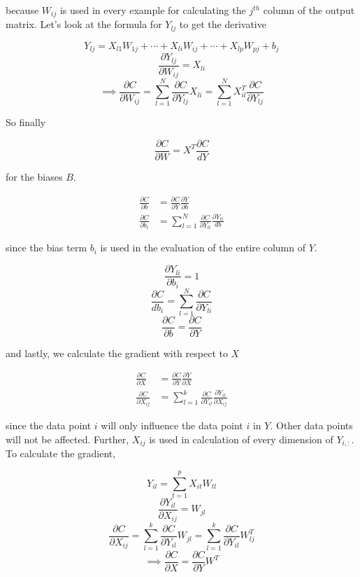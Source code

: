 \documentclass[a4paper, twocolumn, twoside]{article}
\begin{document}
	because $W_{ij}$ is used in every example for calculating the $j^{th}$ column of the output matrix. Let's look at the formula for $Y_{lj}$ to get the derivative

	$$
		Y_{lj} = X_{l1}W_{1j} + \cdots + X_{li}W_{ij} + \cdots + X_{lp}W_{pj} + b_{j}
	$$
	$$
		\frac{\partial Y_{lj}}{\partial W_{ij}} = X_{li}
	$$
	$$
		\implies \frac{\partial C}{\partial W_{ij}} = \sum_{l=1}^{N} \frac{\partial C}{\partial Y_{lj}} X_{li} = \sum_{l=1}^{N} X^{T}_{il}\frac{\partial C}{\partial Y_{lj}}
	$$

	So finally 

	$$
		\frac{\partial C}{\partial W} = X^{T} \frac{\partial C}{dY}
	$$

	for the biases $B$.

	\begin{align}
		\frac{\partial C}{\partial b} &= \frac{\partial C}{\partial Y} \frac{\partial Y}{\partial b}\\
		\frac{\partial C}{\partial b_{i}} &= \sum_{l=1}^{N} \frac{\partial C}{\partial Y_{li}} \frac{\partial Y_{li}}{db}
	\end{align}

	since the bias term $b_{i}$ is used in the evaluation of the entire column of $Y$.

	$$
		\frac{\partial Y_{li}}{\partial b_{i}} = 1
	$$
	$$
		\frac{\partial C}{db_{i}} = \sum_{l=1}^{N} \frac{\partial C}{\partial Y_{li}}
	$$
	$$
		\frac{\partial C}{\partial b} = \frac{\partial C}{\partial Y}
	$$

	and lastly, we calculate the gradient with respect to $X$

	\begin{align}
		\frac{\partial C}{\partial X} &= \frac{\partial C}{\partial Y} \frac{\partial Y}{\partial X}\\
		\frac{\partial C}{\partial X_{ij}} &= \sum_{l=1}^{k} \frac{\partial C}{\partial Y_{il}} \frac{\partial Y_{il}}{\partial X_{ij}}
	\end{align}

	since the data point $i$ will only influence the data point $i$ in $Y$. Other data points will not be affected. Further, $X_{ij}$ is used in calculation of every dimension of $Y_{i,:}$. To calculate the gradient,

	$$
		Y_{il} = \sum_{t=1}^{p} X_{it}W_{tl}
	$$
	$$
		\frac{\partial Y_{il}}{\partial X_{ij}} = W_{jl}
	$$
	$$
		\frac{\partial C}{\partial X_{ij}} = \sum_{l=1}^{k} \frac{\partial C}{\partial Y_{il}}W_{jl}
		= \sum_{l=1}^{k} \frac{\partial C}{\partial Y_{il}} W_{lj}^{T}
	$$
	$$
		\implies \frac{\partial C}{\partial X} = \frac{\partial C}{\partial Y} W^{T}
	$$
\end{document}
